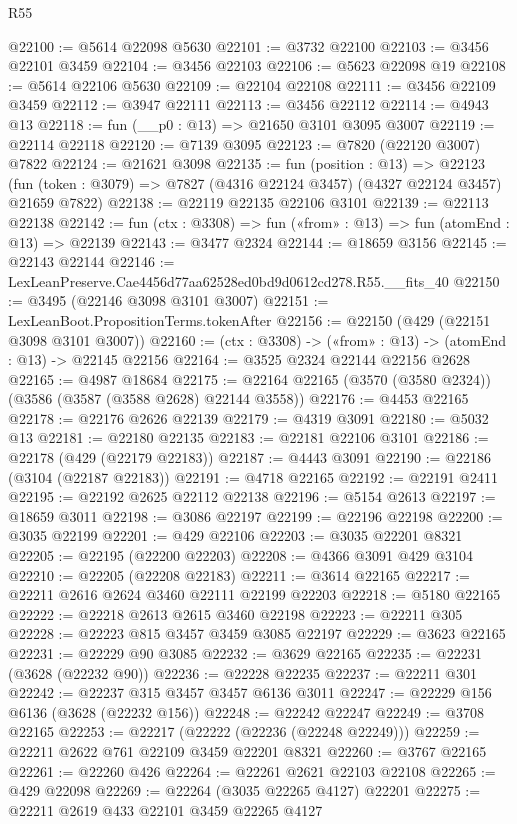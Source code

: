 \begin{lexlean}{R55}
\begin{coremodule}
@22100 := @5614 @22098 @5630
@22101 := @3732 @22100
@22103 := @3456 @22101 @3459
@22104 := @3456 @22103
@22106 := @5623 @22098 @19
@22108 := @5614 @22106 @5630
@22109 := @22104 @22108
@22111 := @3456 @22109 @3459
@22112 := @3947 @22111
@22113 := @3456 @22112
@22114 := @4943 @13
@22118 := fun (__p0 : @13) => @21650 @3101 @3095 @3007
@22119 := @22114 @22118
@22120 := @7139 @3095
@22123 := @7820 (@22120 @3007) @7822
@22124 := @21621 @3098
@22135 := fun (position : @13) =>
  @22123 (fun (token : @3079) => @7827 (@4316 @22124 @3457) (@4327 @22124 @3457) @21659 @7822)
@22138 := @22119 @22135 @22106 @3101
@22139 := @22113 @22138
@22142 := fun (ctx : @3308) => fun («from» : @13) => fun (atomEnd : @13) => @22139
@22143 := @3477 @2324
@22144 := @18659 @3156
@22145 := @22143 @22144
@22146 := LexLeanPreserve.Cae4456d77aa62528ed0bd9d0612cd278.R55.__fits_40
@22150 := @3495 (@22146 @3098 @3101 @3007)
@22151 := LexLeanBoot.PropositionTerms.tokenAfter
@22156 := @22150 (@429 (@22151 @3098 @3101 @3007))
@22160 := (ctx : @3308) -> («from» : @13) -> (atomEnd : @13) -> @22145 @22156
@22164 := @3525 @2324 @22144 @22156 @2628
@22165 := @4987 @18684
@22175 := @22164 @22165 (@3570 (@3580 @2324)) (@3586 (@3587 (@3588 @2628) @22144 @3558))
@22176 := @4453 @22165
@22178 := @22176 @2626 @22139
@22179 := @4319 @3091
@22180 := @5032 @13
@22181 := @22180 @22135
@22183 := @22181 @22106 @3101
@22186 := @22178 (@429 (@22179 @22183))
@22187 := @4443 @3091
@22190 := @22186 (@3104 (@22187 @22183))
@22191 := @4718 @22165
@22192 := @22191 @2411
@22195 := @22192 @2625 @22112 @22138
@22196 := @5154 @2613
@22197 := @18659 @3011
@22198 := @3086 @22197
@22199 := @22196 @22198
@22200 := @3035 @22199
@22201 := @429 @22106
@22203 := @3035 @22201 @8321
@22205 := @22195 (@22200 @22203)
@22208 := @4366 @3091 @429 @3104
@22210 := @22205 (@22208 @22183)
@22211 := @3614 @22165
@22217 := @22211 @2616 @2624 @3460 @22111 @22199 @22203
@22218 := @5180 @22165
@22222 := @22218 @2613 @2615 @3460 @22198
@22223 := @22211 @305
@22228 := @22223 @815 @3457 @3459 @3085 @22197
@22229 := @3623 @22165
@22231 := @22229 @90 @3085
@22232 := @3629 @22165
@22235 := @22231 (@3628 (@22232 @90))
@22236 := @22228 @22235
@22237 := @22211 @301
@22242 := @22237 @315 @3457 @3457 @6136 @3011
@22247 := @22229 @156 @6136 (@3628 (@22232 @156))
@22248 := @22242 @22247
@22249 := @3708 @22165
@22253 := @22217 (@22222 (@22236 (@22248 @22249)))
@22259 := @22211 @2622 @761 @22109 @3459 @22201 @8321
@22260 := @3767 @22165
@22261 := @22260 @426
@22264 := @22261 @2621 @22103 @22108
@22265 := @429 @22098
@22269 := @22264 (@3035 @22265 @4127) @22201
@22275 := @22211 @2619 @433 @22101 @3459 @22265 @4127

\end{coremodule}
\end{lexlean}

